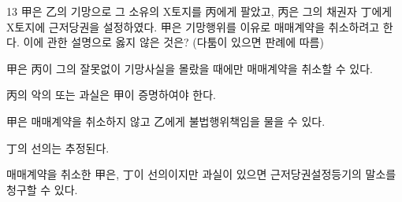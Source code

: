 \begin{question}{13}
甲은 乙의 기망으로 그 소유의 X토지를 丙에게 팔았고, 丙은 그의 채권자 丁에게 X토지에 근저당권을 설정하였다. 甲은 기망행위를 이유로 매매계약을 취소하려고 한다. 이에 관한 설명으로 옳지 않은 것은? (다툼이 있으면 판례에 따름)
\begin{choices}
  \item 甲은 丙이 그의 잘못없이 기망사실을 몰랐을 때에만 매매계약을 취소할 수 있다.
  \item 丙의 악의 또는 과실은 甲이 증명하여야 한다.
  \item 甲은 매매계약을 취소하지 않고 乙에게 불법행위책임을 물을 수 있다.
  \item 丁의 선의는 추정된다.
  \item 매매계약을 취소한 甲은, 丁이 선의이지만 과실이 있으면 근저당권설정등기의 말소를 청구할 수 있다.
\end{choices}
\end{question}
